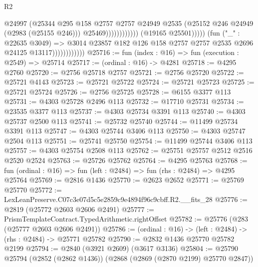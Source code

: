 \begin{lexlean}{R2}
\begin{coremodule}
                                                        @24997
                                                        (@25344
                                                          @295
                                                          @158
                                                          @2757
                                                          @2757
                                                          @24949
                                                          @2535
                                                          (@25152 @246 @24949 (@2983 (@25155 @246)))
                                                          @25469))))))))))))
                                  (@19165 @25501)))))
                          (fun ("_" : @22635 @3049) =>
                          @3014
                            @23857
                            @182
                            @126
                            @158
                            @2757
                            @2757
                            @2535
                            @2696
                            @24125
                            @13117))))))))))))
@25716 := fun (index : @16) => fun (execution : @2549) => @25714
@25717 := (ordinal : @16) -> @4281
@25718 := @4295 @2760
@25720 := @2756 @25718 @2757
@25721 := @2756 @25720
@25722 := @25721 @4143
@25723 := @25721 @25722
@25724 := @25721 @25723
@25725 := @25721 @25724
@25726 := @2756 @25725
@25728 := @6155 @3377 @113
@25731 := @4303 @25728 @2496 @113
@25732 := @17710 @25731
@25734 := @23535 @3377 @113
@25737 := @4303 @25734 @3391 @113
@25740 := @4303 @25737 @2500 @113
@25741 := @25732 @25740
@25744 := @11499 @25734 @3391 @113
@25747 := @4303 @25744 @3406 @113
@25750 := @4303 @25747 @2504 @113
@25751 := @25741 @25750
@25754 := @11499 @25744 @3406 @113
@25757 := @4303 @25754 @2508 @113
@25762 := @25751 @25757 @2512 @2516 @2520 @2524
@25763 := @25726 @25762
@25764 := @4295 @25763
@25768 := fun (ordinal : @16) => fun (left : @2484) => fun (rhs : @2484) => @4295 @25764
@25769 := @2816 @1436
@25770 := @2623 @2652
@25771 := @25769 @25770
@25772 := LexLeanPreserve.C07c3e07d5c5e2859c9e4894f96c9cbff.R2.__fits_28
@25776 := @2819 (@25772 @2603 @2606 @2491)
@25777 := PrismTemplateContract.TypedArithmetic.rightOffset
@25782 := @25776 (@283 (@25777 @2603 @2606 @2491))
@25786 := (ordinal : @16) -> (left : @2484) -> (rhs : @2484) -> @25771 @25782
@25790 := @2832 @1436 @25770 @25782 @2199
@25794 := @2840 (@3921 @2609) (@3617 @3136)
@25804 := @25790 @25794 (@2852 (@2862 @1436)) (@2868 (@2869 (@2870 @2199) @25770 @2847))

\end{coremodule}
\end{lexlean}
